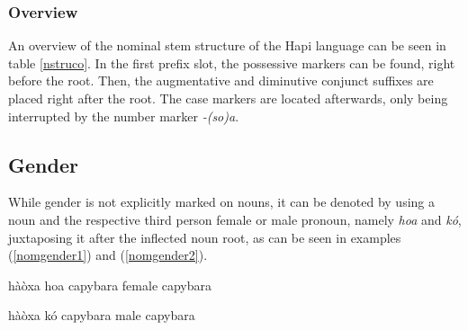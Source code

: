 \documentclass[a4paper, 12pt, oneside]{memoir}
\newcommand{\emh}[1]{\textit{#1}}
\begin{document}
\subsubsection{Overview}
An overview of the nominal stem structure of the Hapi language can be seen in table \ref{nstruco}.
In the first prefix slot, the possessive markers can be found, right before the root. Then, the augmentative and diminutive conjunct suffixes are placed right after the root. The case markers are located afterwards, only being interrupted by the number marker \emh{-(so)a}.
\begin{table}[p!]
    \centering
    \caption{Nominal Stem Structure}
    \label{nstruco}
\end{table}

\subsection{Gender}\label{sgender}
While gender is not explicitly marked on nouns, it can be denoted by using a noun and the respective third person female or male pronoun, namely \emh{hoa} and \emh{kó}, juxtaposing it after the inflected noun root, as can be seen in examples (\ref{nomgender1}) and (\ref{nomgender2}).
\begin{example}
\label{nomgender1}
\bits hàòxa hoa
\gloss capybara {\Tsf}
\tr female capybara
\end{example}
\begin{example}
\label{nomgender2}
\bits hàòxa kó 
\gloss capybara {\Tsm} 
\tr male capybara
\end{example}
\end{document}
